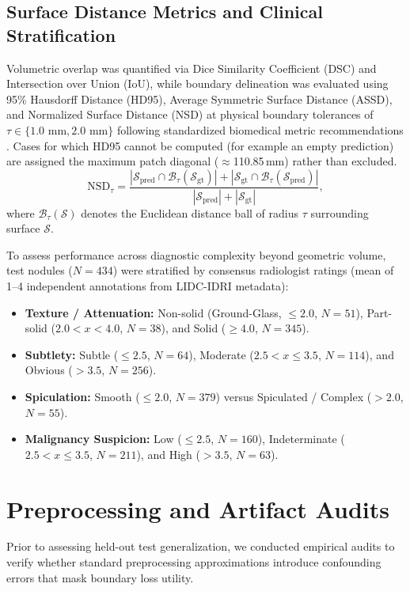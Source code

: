 \documentclass[10pt, a4paper, twocolumn]{article}
\begin{document}
\subsection{Surface Distance Metrics and Clinical Stratification}
Volumetric overlap was quantified via Dice Similarity Coefficient (DSC) and Intersection over Union (IoU), while boundary delineation was evaluated using 95\% Hausdorff Distance (HD95), Average Symmetric Surface Distance (ASSD), and Normalized Surface Distance (NSD) at physical boundary tolerances of $\tau \in \{1.0\text{ mm}, 2.0\text{ mm}\}$ following standardized biomedical metric recommendations \cite{maierhein2024metrics, taha2015metrics}. Cases for which HD95 cannot be computed (for example an empty prediction) are assigned the maximum patch diagonal ($\approx$110.85\,mm) rather than excluded.
\begin{equation}
\text{NSD}_\tau = \frac{|\mathcal{S}_{\text{pred}} \cap \mathcal{B}_{\tau}(\mathcal{S}_{\text{gt}})| + |\mathcal{S}_{\text{gt}} \cap \mathcal{B}_{\tau}(\mathcal{S}_{\text{pred}})|}{|\mathcal{S}_{\text{pred}}| + |\mathcal{S}_{\text{gt}}|},
\end{equation}
where $\mathcal{B}_{\tau}(\mathcal{S})$ denotes the Euclidean distance ball of radius $\tau$ surrounding surface $\mathcal{S}$. 

To assess performance across diagnostic complexity beyond geometric volume, test nodules ($N=434$) were stratified by consensus radiologist ratings (mean of 1--4 independent annotations from LIDC-IDRI metadata):
\begin{itemize}
    \item \textbf{Texture / Attenuation:} Non-solid (Ground-Glass, $\le 2.0$, $N=51$), Part-solid ($2.0 < x < 4.0$, $N=38$), and Solid ($\ge 4.0$, $N=345$).
    \item \textbf{Subtlety:} Subtle ($\le 2.5$, $N=64$), Moderate ($2.5 < x \le 3.5$, $N=114$), and Obvious ($> 3.5$, $N=256$).
    \item \textbf{Spiculation:} Smooth ($\le 2.0$, $N=379$) versus Spiculated / Complex ($> 2.0$, $N=55$).
    \item \textbf{Malignancy Suspicion:} Low ($\le 2.5$, $N=160$), Indeterminate ($2.5 < x \le 3.5$, $N=211$), and High ($> 3.5$, $N=63$).
\end{itemize}

\section{Preprocessing and Artifact Audits}
Prior to assessing held-out test generalization, we conducted empirical audits to verify whether standard preprocessing approximations introduce confounding errors that mask boundary loss utility.
\end{document}
